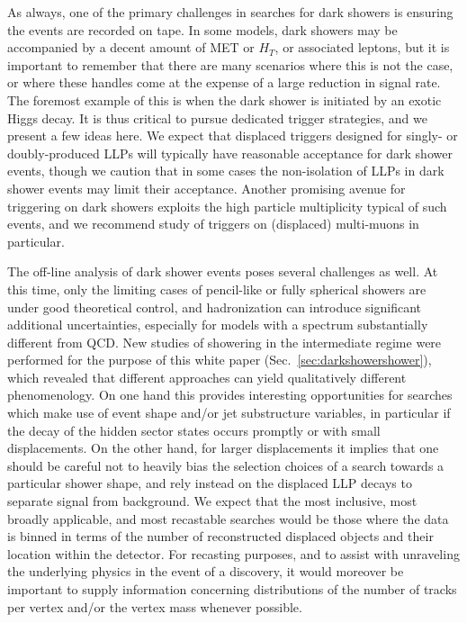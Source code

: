 As always, one of the primary challenges in searches for dark showers is ensuring the events are recorded on tape.  In some models, dark showers may be accompanied by a decent amount of MET or $H_T$, or associated leptons, but it is important to remember that there are many scenarios where this is not the case, or where these handles come at the expense of a large reduction in signal rate. The foremost example of this is when the dark shower is initiated by an exotic Higgs decay.  It is thus critical to pursue dedicated trigger strategies, and we present a few ideas here. We expect that displaced triggers designed for singly- or doubly-produced LLPs will typically have reasonable acceptance for dark shower events, though we caution that in some cases the non-isolation of LLPs in dark shower events may limit their acceptance.  Another promising avenue for triggering on dark showers exploits the high particle multiplicity typical of such events, and we recommend study of triggers on (displaced) multi-muons in particular.

The off-line analysis of dark shower events poses several challenges as well.  At this time, only the limiting cases of pencil-like or fully spherical showers are under good theoretical control, and hadronization can introduce significant additional uncertainties, especially for models with a spectrum substantially different from QCD.  New studies of showering in the intermediate regime were performed for the purpose of this white paper (Sec.~\ref{sec:darkshowershower}), which revealed that different approaches can yield qualitatively different phenomenology.  On one hand this provides interesting opportunities for searches which make use of event shape and/or jet substructure variables, in particular if the decay of the hidden sector states occurs promptly or with small displacements. On the other hand, for larger displacements it implies that one should be careful not to heavily bias the selection choices of a search towards a particular shower shape, and rely instead on the displaced LLP decays to separate signal from background.  We expect that the most inclusive, most broadly applicable, and most recastable searches would be those where the data is binned in terms of the number of reconstructed displaced objects and their  location within the detector.  For recasting purposes, and to assist with unraveling the underlying physics in the event of a discovery, it would moreover be important to supply information concerning distributions of the number of tracks per vertex and/or the vertex mass whenever possible.

